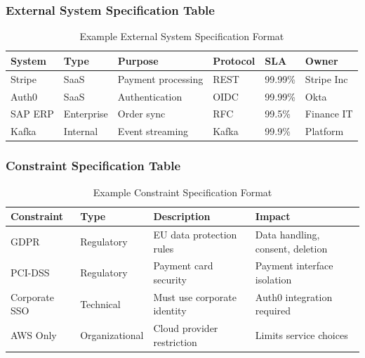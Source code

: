 \documentclass[11pt,letterpaper]{article}
\begin{document}
\subsubsection{External System Specification Table}

\begin{table}[H]
\centering
\caption{Example External System Specification Format}
\small
\begin{tabular}{@{}L{2cm}L{2cm}L{2.5cm}L{2cm}L{2cm}L{2cm}@{}}
\toprule
\textbf{System} & \textbf{Type} & \textbf{Purpose} & \textbf{Protocol} & \textbf{SLA} & \textbf{Owner} \\
\midrule
Stripe & SaaS & Payment processing & REST & 99.99\% & Stripe Inc \\
Auth0 & SaaS & Authentication & OIDC & 99.99\% & Okta \\
SAP ERP & Enterprise & Order sync & RFC & 99.5\% & Finance IT \\
Kafka & Internal & Event streaming & Kafka & 99.9\% & Platform \\
\bottomrule
\end{tabular}
\end{table}

\subsubsection{Constraint Specification Table}

\begin{table}[H]
\centering
\caption{Example Constraint Specification Format}
\small
\begin{tabular}{@{}L{2.5cm}L{2.8cm}L{3.8cm}L{\dimexpr\linewidth-9.1cm-6\tabcolsep\relax}@{}}
\toprule
\textbf{Constraint} & \textbf{Type} & \textbf{Description} & \textbf{Impact} \\
\midrule
GDPR & Regulatory & EU data protection rules & Data handling, consent, deletion \\
PCI-DSS & Regulatory & Payment card security & Payment interface isolation \\
Corporate SSO & Technical & Must use corporate identity & Auth0 integration required \\
AWS Only & Organizational & Cloud provider restriction & Limits service choices \\
\bottomrule
\end{tabular}
\end{table}

\end{document}
